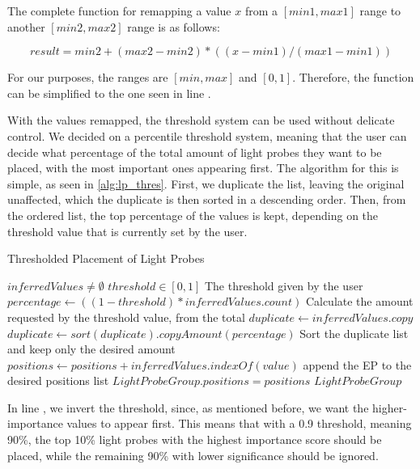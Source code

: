 The complete function for remapping a value $x$ from a \([min1, max1]\) range to another \([min2, max2]\) range is as follows:

\[ result = min2 + (max2 - min2) * ((x - min1)/(max1 - min1)) \]

For our purposes, the ranges are \([min, max]\) and \([0, 1]\). Therefore, the function can be simplified to the one seen in line .\newline

With the values remapped, the threshold system can be used without delicate control. We decided on a percentile threshold system, meaning that the user can decide what percentage of the total amount of light probes they want to be placed, with the most important ones appearing first. The algorithm for this is simple, as seen in \ref{alg:lp_thres}. First, we duplicate the list, leaving the original unaffected, which the duplicate is then sorted in a descending order. Then, from the ordered list, the top percentage of the values is kept, depending on the threshold value that is currently set by the user.

\begin{algorithm}
	\caption{Thresholded Placement of Light Probes}
	\label{alg:lp_thres}
	\begin{algorithmic}[1]
		\Require $inferredValues \neq \emptyset$
		\Require $threshold \in [0, 1]$
		\Comment The threshold given by the user
		\State $percentage \gets ((1-threshold) * inferredValues.count)$
		\Comment Calculate the amount requested by the threshold value, from the total
		\label{alg:lp_thres:1}
		\State $duplicate \gets inferredValues.copy$
		\State $duplicate \gets sort(duplicate).copyAmount(percentage)$
		\Comment Sort the duplicate list and keep only the desired amount
			\State $positions \gets positions + inferredValues.indexOf(value)$
			\Comment append the EP to the desired positions list
		\EndFor
		\State $LightProbeGroup.positions = positions$
		\State \Return $Light Probe Group$
	\end{algorithmic}
\end{algorithm}

In line , we invert the threshold, since, as mentioned before, we want the higher-importance values to appear first. This means that with a 0.9 threshold, meaning 90\%, the top 10\% light probes with the highest importance score should be placed, while the remaining 90\% with lower significance should be ignored.\newline 

